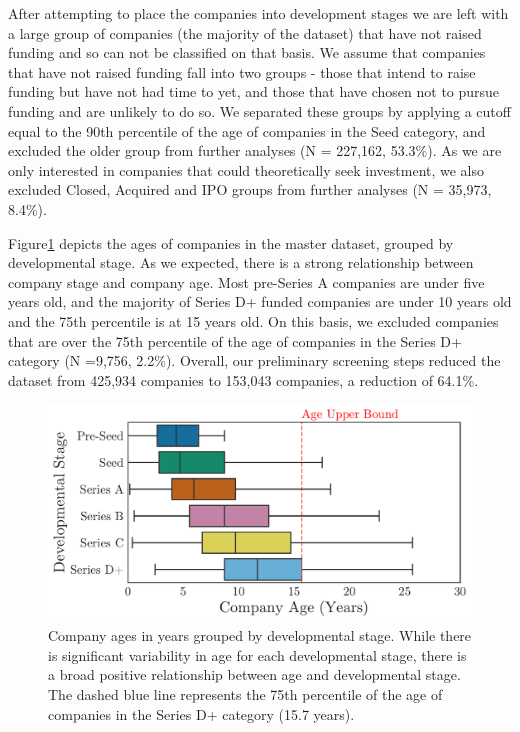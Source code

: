 \documentclass[../thesis/thesis.tex]{subfiles}
\begin{document}
After attempting to place the companies into development stages we are left with a large group of companies (the majority of the dataset) that have not raised funding and so can not be classified on that basis. We assume that companies that have not raised funding fall into two groups - those that intend to raise funding but have not had time to yet, and those that have chosen not to pursue funding and are unlikely to do so. We separated these groups by applying a cutoff equal to the 90th percentile of the age of companies in the Seed category, and excluded the older group from further analyses (N = 227,162,  53.3\%). As we are only interested in companies that could theoretically seek investment, we also excluded Closed, Acquired and IPO groups from further analyses (N = 35,973, 8.4\%).

Figure\ref{fig:design:stages_ages} depicts the ages of companies in the master dataset, grouped by developmental stage.  As we expected, there is a strong relationship between company stage and company age. Most pre-Series A companies are under five years old, and the majority of Series D+ funded companies are under 10 years old and the 75th percentile is at 15 years old. On this basis, we excluded companies that are over the 75th percentile of the age of companies in the Series D+ category (N =9,756, 2.2\%). Overall, our preliminary screening steps reduced the dataset from 425,934 companies to 153,043 companies, a reduction of 64.1\%.

\begin{figure}[!htb]
    \centering
    \includegraphics[width=\textwidth]{../figures/design/stages_ages}
    \caption[Company age distribution]{Company ages in years grouped by developmental stage. While there is significant variability in age for each developmental stage, there is a broad positive relationship between age and developmental stage. The dashed blue line represents the 75th percentile of the age of companies in the Series D+ category (15.7 years).}
    \label{fig:design:stages_ages}
\end{figure}
\end{document}
